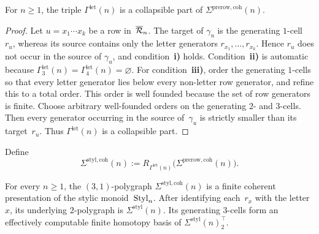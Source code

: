 \documentclass[a4paper, twoside, 11pt, english]{article}
\begin{document}
\begin{lemma}
\label{L:LetterCompressionCollapsible}
For  $n\geq1$, the triple
$\Gamma^{\mathrm{let}}(n)$ is a collapsible part of
$\Sigma^{\mathrm{prerow,coh}}(n)$.
\end{lemma}

\begin{proof}
Let $u=x_1\cdots x_k$ be a row in~$\overline{\mathcal{R}}_n$. The target of
$\gamma_u$ is the generating $1$-cell~$r_u$, whereas its source
contains only the letter generators
$r_{x_1},\ldots,r_{x_k}$. Hence $r_u$ does not occur in the source of
$\gamma_u$, and condition~\textup{\textbf{i)}} holds.
Condition~\textup{\textbf{ii)}} is automatic because
$\Gamma^{\mathrm{let}}_3(n)=
\Gamma^{\mathrm{let}}_4(n)=\varnothing$.
For condition~\textup{\textbf{iii)}}, order the generating $1$-cells
so that every letter generator lies below every non-letter row
generator, and refine this to a total order. This order is well founded
because the set of row generators is finite. Choose arbitrary
well-founded orders on the generating $2$- and $3$-cells. Then every
generator occurring in the source of~$\gamma_u$ is strictly smaller
than its target~$r_u$. Thus
$\Gamma^{\mathrm{let}}(n)$ is a collapsible part.
\end{proof}

Define
\[
\Sigma^{\mathrm{styl,coh}}(n)
:=
R_{\Gamma^{\mathrm{let}}(n)}
\bigl(
\Sigma^{\mathrm{prerow,coh}}(n)
\bigr).
\]

\begin{theorem}
\label{T:LetterCoherentPresentation}
For every $n\geq1$, the $(3,1)$-polygraph
$\Sigma^{\mathrm{styl,coh}}(n)$ is a finite coherent presentation of
the stylic monoid~$\mathrm{Styl}_n$. After identifying each~$r_x$ with the
letter~$x$, its underlying $2$-polygraph is
$\Sigma^{\mathrm{styl}}(n)$. Its generating $3$-cells form an
effectively computable finite homotopy basis of
$\Sigma^{\mathrm{styl}}(n)_2^\top$.
\end{theorem}
\end{document}
